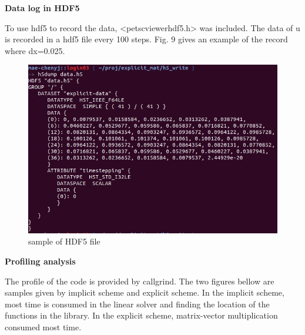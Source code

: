 \documentclass[a4paper,10pt]{article}
\begin{document}
\large \textbf {Data log in HDF5}

To use hdf5 to record the data, <petscviewerhdf5.h> was included. The data of u is recorded in a hdf5 file every 100 steps. Fig. 9 gives an example of the record where dx=0.025.
\begin{figure}[h]
	\centering
	\includegraphics[scale=0.6]{hdf5_sample.jpg}
	\caption{sample of HDF5 file}
\end{figure}

\clearpage

\large \textbf {Profiling analysis}

The profile of the code is provided by callgrind. The two figures bellow are samples given by implicit scheme and explicit scheme. In the implicit scheme, most time is consumed in the linear solver and finding the location of the functions in the library. In the explicit scheme, matrix-vector multiplication consumed most time.
\end{document}
